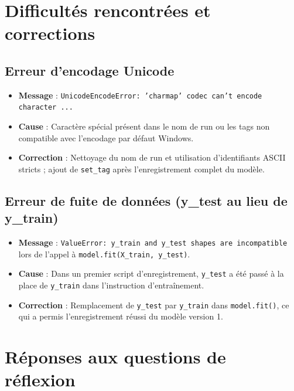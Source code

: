 \documentclass[12pt,a4paper]{report}
\begin{document}
\chapter*{Difficultés rencontrées et corrections}

\section{Erreur d'encodage Unicode}
\begin{itemize}
    \item \textbf{Message} : \texttt{UnicodeEncodeError: 'charmap' codec can't encode character ...}
    \item \textbf{Cause} : Caractère spécial présent dans le nom de run ou les tags non compatible avec l'encodage par défaut Windows.
    \item \textbf{Correction} : Nettoyage du nom de run et utilisation d'identifiants ASCII stricts ; ajout de \texttt{set\_tag} après l'enregistrement complet du modèle.
\end{itemize}

\section{Erreur de fuite de données (y\_test au lieu de y\_train)}
\begin{itemize}
    \item \textbf{Message} : \texttt{ValueError: y\_train and y\_test shapes are incompatible} lors de l'appel à \texttt{model.fit(X\_train, y\_test)}.
    \item \textbf{Cause} : Dans un premier script d'enregistrement, \texttt{y\_test} a été passé à la place de \texttt{y\_train} dans l'instruction d'entraînement.
    \item \textbf{Correction} : Remplacement de \texttt{y\_test} par \texttt{y\_train} dans \texttt{model.fit()}, ce qui a permis l'enregistrement réussi du modèle version 1.
\end{itemize}

\chapter*{Réponses aux questions de réflexion}
\end{document}
